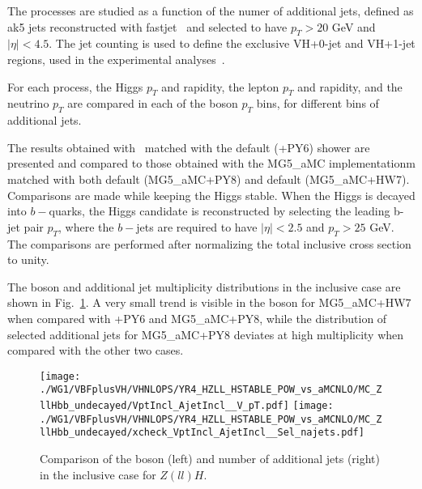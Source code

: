 The processes are studied as a function of the numer of additional jets,
defined as ak5 jets reconstructed with fastjet~\cite{} and selected to have $p_T > 20$ GeV and $|\eta| < 4.5$.
The jet counting is used to define the exclusive VH+0-jet and VH+1-jet regions, used in the experimental analyses~\cite{atlas_vh,cms_vh}.

For each process, the Higgs $p_T$ and rapidity, the lepton $p_T$ and rapidity, and the neutrino $p_T$
are compared in each of the boson $p_T$ bins, for different bins of additional jets.

The results obtained with \POWHEGBOX\ matched with the default  (\POWHEG{}+PY6) shower are presented and compared 
to those obtained with the {\sc MG5\_aMC} implementationm matched with both default  ({\sc MG5\_aMC}+PY8) and default  ({\sc MG5\_aMC}+HW7). 
%
Comparisons are made while keeping the Higgs stable.
%
When the Higgs is decayed into $b-$quarks, the Higgs candidate is reconstructed
by selecting the leading b-jet pair $p_T$, where the $b-$jets are required to have $|\eta| <2.5$ and $p_T > 25$ GeV.
%
The comparisons are performed after normalizing the total inclusive cross section to unity.

The boson \pt and additional jet multiplicity distributions in the inclusive case are shown in Fig.~\ref{fig:stable__incl_vpt_jets}.
A very small trend is visible in the boson \pt for {\sc MG5\_aMC}+HW7 when compared with \POWHEG{}+PY6 and {\sc MG5\_aMC}+PY8,
while the distribution of selected additional jets for {\sc MG5\_aMC}+PY8 deviates at high multiplicity when compared with the other two cases.
\begin{figure}
\centering
\texttt{[image: ./WG1/VBFplusVH/VHNLOPS/YR4\_HZLL\_HSTABLE\_POW\_vs\_aMCNLO/MC\_ZllHbb\_undecayed/VptIncl\_AjetIncl\_\_V\_pT.pdf]}
\texttt{[image: ./WG1/VBFplusVH/VHNLOPS/YR4\_HZLL\_HSTABLE\_POW\_vs\_aMCNLO/MC\_ZllHbb\_undecayed/xcheck\_VptIncl\_AjetIncl\_\_Sel\_najets.pdf]}
\caption{Comparison of the boson \pt (left) and number of additional jets (right) in the inclusive case for $Z(ll)H$.}
\label{fig:stable__incl_vpt_jets}
\end{figure}

